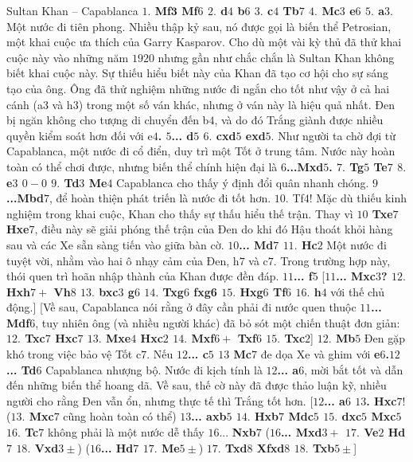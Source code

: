 \begin{multicols}{2}
	\vskip 0.1cm
	Sultan Khan -- Capablanca
	\vskip 0.1cm
	\textbf{\color{gocco}$1.$ Mf$\pmb{3}$ Mf$6$ $2.$ d$4$ b$6$ $3.$ c$4$ Tb$7$ $4.$ Mc$3$ e$6$ $5.$ a$3$}. Một nước đi tiên phong. Nhiều thập kỷ sau, nó được gọi là biến thể Petrosian, một khai cuộc ưa thích của Garry Kasparov. Cho dù một vài kỳ thủ đã thử khai cuộc  này vào những năm $1920$ nhưng gần như chắc chắn là Sultan Khan không biết khai cuộc này. Sự thiếu hiểu biết này của Khan đã tạo cơ hội cho sự sáng tạo của ông. Ông đã thử nghiệm những nước đi ngắn cho tốt như vậy ở cả hai cánh (a$3$ và h$3$) trong một số ván khác, nhưng ở ván này là hiệu quả nhất. Đen bị ngăn không cho tượng di chuyển đến b$4$, và do đó Trắng giành được nhiều quyền kiểm soát hơn đối với e\textbf{\color{gocco}$4$. $5$... d$5$ $6.$ cxd$5$ exd$5$}. Như người ta chờ đợi từ Capablanca, một nước đi cổ điển, duy trì một Tốt ở trung tâm. Nước này hoàn toàn có thể chơi được, nhưng biến thể chính hiện đại là \textbf{\color{gocco}$6$...Mxd$5$. $7.$ Tg$5$ Te$7$ $8.$ e$3$ $0-0$ $9.$ Td$3$ Me$4$} Capablanca cho thấy ý định đổi quân nhanh chóng. \textbf{\color{gocco}$9$...Mbd$7$}, để hoàn thiện phát triến là nước đi tốt hơn. $10.$ Tf$4$! Mặc dù thiếu kinh nghiệm trong khai cuộc, Khan cho thấy sự thấu hiểu thế trận. Thay vì \textbf{\color{gocco}$10$ Txe$7$ Hxe$7$}, điều này sẽ giải phóng thế trận của Đen do khi đó Hậu thoát khỏi hàng sau và các Xe sẵn sàng tiến vào giữa bàn cờ. \textbf{\color{gocco}$10$... Md$7$ $11.$ Hc$2$} Một nước đi tuyệt vời, nhằm vào hai ô nhạy cảm của Đen, h$7$ và c$7$. Trong trường hợp này, thói quen trì hoãn nhập thành của Khan được đền đáp. \textbf{\color{gocco}$11$... f$5$} 
	\vskip 0.1cm
	[\textbf{\color{gocco}$11$... Mxc$3$? $12.$ Hxh$7+$ Vh$8$ $13.$ bxc$3$ g$6$ $14.$ Txg$6$ fxg6 $15.$ Hxg$6$ Tf$6$ $16.$ h$4$} với thế chủ động.]
	\vskip 0.1cm
	[Về sau, Capablanca nói rằng ở đây cần phải đi nước quen thuộc \textbf{\color{gocco}$11$... Mdf$6$}, tuy nhiên ông (và nhiều người khác) đã bỏ sót một chiến thuật đơn giản: \textbf{\color{gocco}$12.$ Txc$7$ Hxc$7$ $13.$ Mxe$4$ Hxc$2$ $14.$ Mxf$6+$ Txf$6$ $15.$ Txc$2$}]
	\vskip 0.1cm
	\textbf{\color{gocco}$12.$ Mb$5$} Đen gặp khó trong việc bảo vệ Tốt c$7$. Nếu \textbf{\color{gocco}$12$... c$5$ $13$ Mc$7$} đe dọa Xe và ghim với \textbf{\color{gocco}e$6$.$12$... Td$6$} Capablanca nhượng bộ. Nước đi kịch tính là \textbf{\color{gocco}$12$... a$6$}, mời bắt tốt và dẫn đến những biến thể hoang dã. Về sau, thế cờ này đã được thảo luận kỹ, nhiều người cho rằng Đen vẫn ổn, nhưng thực tế thì Trắng tốt hơn. 
	\vskip 0.1cm
	[\textbf{\color{gocco}$12$... a$6$ $13$. Hxc$7$}! (\textbf{\color{gocco}$13.$ Mxc$7$} cũng hoàn toàn có thể) \textbf{\color{gocco}$13$... axb$5$ $14.$ Hxb$7$ Mdc$5$ $15.$ dxc$5$ Mxc$5$ $16.$ Tc$7$} không phải là một nước dễ thấy $16$... \textbf{\color{gocco}Nxb$7$} (\textbf{\color{gocco}$16$... Mxd$3+$ $17.$ Ve$2$ Hd$7$ $18.$ Vxd$3\pm$}) (\textbf{\color{gocco}$16$... Hd$7$ $17.$ Me$5\pm$}) \textbf{\color{gocco}$17.$ Txd$8$ Xfxd$8$ $18.$ Txb$5\pm$}]

\end{multicols}

